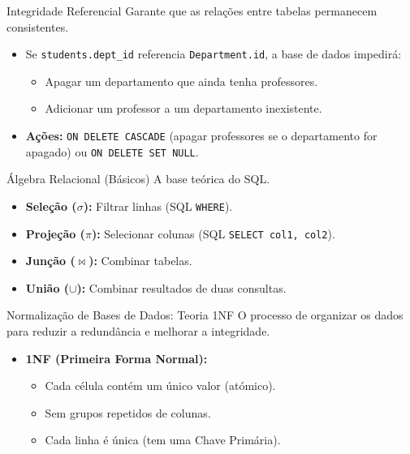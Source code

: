 \documentclass[
  ignorenonframetext,
]{beamer}
\providecommand{\tightlist}{%
  \setlength{\itemsep}{0pt}\setlength{\parskip}{0pt}}
\begin{document}
\begin{frame}[fragile]{Integridade Referencial}
\protect{}\label{integridade-referencial}
Garante que as relações entre tabelas permanecem consistentes.

\begin{itemize}
\tightlist
\item
  Se \texttt{students.dept\_id} referencia \texttt{Department.id}, a
  base de dados impedirá:

  \begin{itemize}
  \tightlist
  \item
    Apagar um departamento que ainda tenha professores.
  \item
    Adicionar um professor a um departamento inexistente.
  \end{itemize}
\item
  \textbf{Ações:} \texttt{ON\ DELETE\ CASCADE} (apagar professores se o
  departamento for apagado) ou \texttt{ON\ DELETE\ SET\ NULL}.
\end{itemize}
\end{frame}

\begin{frame}[fragile]{Álgebra Relacional (Básicos)}
\protect{}\label{uxe1lgebra-relacional-buxe1sicos}
A base teórica do SQL.

\begin{itemize}
\tightlist
\item
  \textbf{Seleção (\(\sigma\)):} Filtrar linhas (SQL \texttt{WHERE}).
\item
  \textbf{Projeção (\(\pi\)):} Selecionar colunas (SQL
  \texttt{SELECT\ col1,\ col2}).
\item
  \textbf{Junção (\(\bowtie\)):} Combinar tabelas.
\item
  \textbf{União (\(\cup\)):} Combinar resultados de duas consultas.
\end{itemize}
\end{frame}

\begin{frame}{Normalização de Bases de Dados: Teoria 1NF}
\protect{}\label{normalizauxe7uxe3o-de-bases-de-dados-teoria-1nf}
O processo de organizar os dados para reduzir a redundância e melhorar a
integridade.

\begin{itemize}
\tightlist
\item
  \textbf{1NF (Primeira Forma Normal):}

  \begin{itemize}
  \tightlist
  \item
    Cada célula contém um único valor (atómico).
  \item
    Sem grupos repetidos de colunas.
  \item
    Cada linha é única (tem uma Chave Primária).
  \end{itemize}
\end{itemize}
\end{frame}
\end{document}
